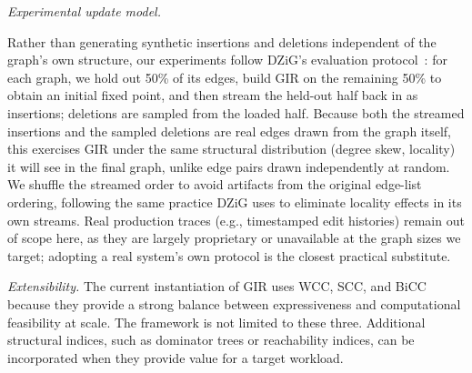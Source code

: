 \textit{Experimental update model.}
\begin{needsrerun}
Rather than generating synthetic insertions and deletions independent of the
graph's own structure, our experiments follow DZiG's evaluation
protocol~\cite{mariappan2021dzig}: for each graph, we hold out 50\% of its
edges, build GIR on the remaining 50\% to obtain an initial fixed point, and
then stream the held-out half back in as insertions; deletions are sampled
from the loaded half. Because both the streamed insertions and the sampled
deletions are real edges drawn from the graph itself, this exercises GIR
under the same structural distribution (degree skew, locality) it will see
in the final graph, unlike edge pairs drawn independently at random. We
shuffle the streamed order to avoid artifacts from the original edge-list
ordering, following the same practice DZiG uses to eliminate locality
effects in its own streams. Real production traces (e.g., timestamped edit
histories) remain out of scope here, as they are largely proprietary or
unavailable at the graph sizes we target; adopting a real system's own
protocol is the closest practical substitute.
\end{needsrerun}

\textit{Extensibility.}
The current instantiation of GIR uses WCC, SCC, and BiCC because
they provide a strong balance between expressiveness and
computational feasibility at scale.
The framework is not limited to these three.
Additional structural indices, such as dominator trees or
reachability indices, can be incorporated when they provide
value for a target workload.




